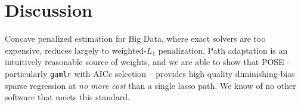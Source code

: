 \documentclass[12pt]{article}
\begin{document}
\section{Discussion}
\label{discussion}


Concave penalized estimation for Big Data, where exact solvers are too
 expensive, reduces largely to weighted-$L_1$ penalization.
Path adaptation is an intuitively reasonable source of weights, and we are able to show that POSE -- particularly {\tt gamlr} with AICc selection -- provides high quality diminishing-bias sparse regression at
{\it no more cost} than a  single lasso path.  We know of no other software that meets this standard.





\end{document}
